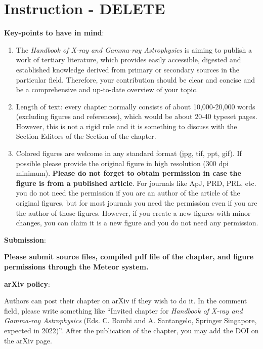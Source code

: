 \documentclass[graybox, nosecnum]{svmult}
\begin{document}
\section{Instruction - DELETE}

\vspace{0.3cm}

{\bf Key-points to have in mind}:
\begin{enumerate}
\item The {\it Handbook of X-ray and Gamma-ray Astrophysics} is aiming to publish a work of tertiary literature, which provides easily accessible, digested and established knowledge derived from primary or secondary sources in the particular field. Therefore, your contribution should be clear and concise and be a comprehensive and up-to-date overview of your topic.
\item Length of text: every chapter normally consists of about 10,000-20,000 words (excluding figures and references), which would be about 20-40 typeset pages. However, this is not a rigid rule and it is something to discuss with the Section Editors of the Section of the chapter.
\item Colored figures are welcome in any standard format (jpg, tif, ppt, gif). If possible please provide the original figure in high resolution (300 dpi minimum). {\color{red}\bf Please do not forget to obtain permission in case the figure is from a published article}. For journals like ApJ, PRD, PRL, etc. you do not need the permission if you are an author of the article of the original figures, but for most journals you need the permission even if you are the author of those figures. However, if you create a new figures with minor changes, you can claim it is a new figure and you do not need any permission.
\end{enumerate}


\vspace{0.5cm}

{\bf Submission}:

\vspace{0.1cm}

{\color{red} \bf Please submit source files, compiled pdf file of the chapter, and figure permissions through the Meteor system.}

\vspace{0.5cm}

{\bf arXiv policy}:

\vspace{0.1cm}

{Authors can post their chapter on arXiv if they wish to do it. In the comment field, please write something like ``Invited chapter for {\it Handbook of X-ray and Gamma-ray Astrophysics} (Eds. C. Bambi and A. Santangelo, Springer Singapore, expected in 2022)''. After the publication of the chapter, you may add the DOI on the arXiv page.}
\end{document}
